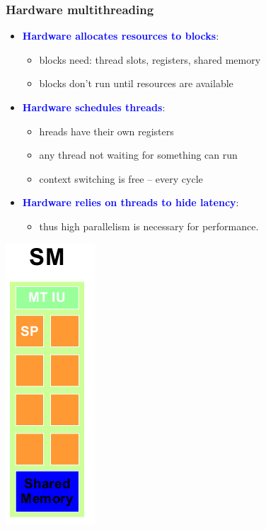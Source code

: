 \begin{frame}[fragile]
\frametitle{Hardware multithreading}

\begin{itemize}
\item \textcolor{blue}{\bf Hardware allocates resources to blocks}:
\begin{itemize}
\item blocks need: thread slots, registers, shared memory
\item blocks don't run until resources are available
\end{itemize}
\item \textcolor{blue}{\bf Hardware schedules threads}:
\begin{itemize}
\item hreads have their own registers
\item any thread not waiting for something can run
\item context switching is free – every cycle
\end{itemize}
\item \textcolor{blue}{\bf Hardware relies on threads to hide latency}:
\begin{itemize}
\item thus high  parallelism is necessary for performance.
\end{itemize}
\end{itemize}


\begin{center}
\includegraphics[scale=0.35]{images/39.png}
\end{center}
\end{frame}
